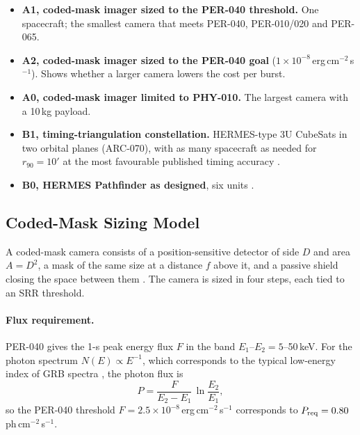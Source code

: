 \begin{itemize}
\item \textbf{A1, coded-mask imager sized to the PER-040 threshold.} One spacecraft; the
smallest camera that meets PER-040, PER-010/020 and PER-065.
\item \textbf{A2, coded-mask imager sized to the PER-040 goal}
($1\times10^{-8}$\,erg\,cm$^{-2}$\,s$^{-1}$). Shows whether a larger camera lowers the cost
per burst.
\item \textbf{A0, coded-mask imager limited to PHY-010.} The largest camera with a 10\,kg
payload.
\item \textbf{B1, timing-triangulation constellation.} HERMES-type 3U CubeSats
\cite{Ghirlanda2024,Fiore2020} in two orbital planes (ARC-070), with as many spacecraft as
needed for $r_{90}=10'$ at the most favourable published timing accuracy
\cite{Werner2018}.
\item \textbf{B0, HERMES Pathfinder as designed}, six units \cite{Ghirlanda2024}.
\end{itemize}

\subsection{Coded-Mask Sizing Model}

A coded-mask camera consists of a position-sensitive detector of side $D$ and area $A=D^2$,
a mask of the same size at a distance $f$ above it, and a passive shield closing the space
between them \cite{Braga2019}. The camera is sized in four steps, each tied to an SRR
threshold.

\paragraph{Flux requirement.} PER-040 gives the 1-s peak energy flux $F$ in the band
$E_1$--$E_2=5$--50\,keV. For the photon spectrum $N(E)\propto E^{-1}$, which corresponds to
the typical low-energy index of GRB spectra \cite{Band1993}, the photon flux is
\begin{equation}\label{eq:pflux}
P = \frac{F}{E_2-E_1}\,\ln\frac{E_2}{E_1},
\end{equation}
so the PER-040 threshold $F=2.5\times10^{-8}$\,erg\,cm$^{-2}$\,s$^{-1}$ corresponds to
$P_{\rm req}=0.80$\,ph\,cm$^{-2}$\,s$^{-1}$.

